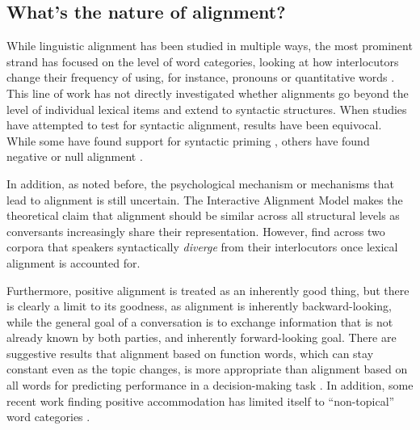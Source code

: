 \documentclass[11pt]{article}
\begin{document}
\subsection{What's the nature of alignment?}

While linguistic alignment has been studied in multiple ways, the most prominent strand has focused on the level of word categories, looking at how interlocutors change their frequency of using, for instance, pronouns or quantitative words  \cite{DNMEtAl2012,IrelandEtAl2011}. This line of work has not directly investigated whether alignments go beyond the level of individual lexical items and extend to syntactic structures. When studies have attempted to test for syntactic alignment, results have been equivocal. While some have found support for syntactic priming \cite{gries2005syntactic,dubey2005parallelism}, others have found negative or null alignment \cite{HealeyPurverHowes2014,reitter2010priming}.

In addition, as noted before, the psychological mechanism or mechanisms that lead to alignment is still uncertain. The Interactive Alignment Model \cite{PickeringGarrod2004} makes the theoretical claim that alignment should be similar across all structural levels as conversants increasingly share their representation. However, \cite{HealeyPurverHowes2014} find across two corpora that speakers syntactically \emph{diverge} from their interlocutors once lexical alignment is accounted for.







Furthermore, positive alignment is treated as an inherently good thing, but there is clearly a limit to its goodness, as alignment is inherently backward-looking, while the general goal of a conversation is to exchange information that is not already known by both parties, and inherently forward-looking goal. There are suggestive results that alignment based on function words, which can stay constant even as the topic changes, is more appropriate than alignment based on all words for predicting performance in a decision-making task \cite{FusaroliEtAl2012}. In addition, some recent work finding positive accommodation has limited itself to ``non-topical'' word categories \cite{DNMGamonDumais2011,DoyleYurovskyFrank2016}.
\end{document}
